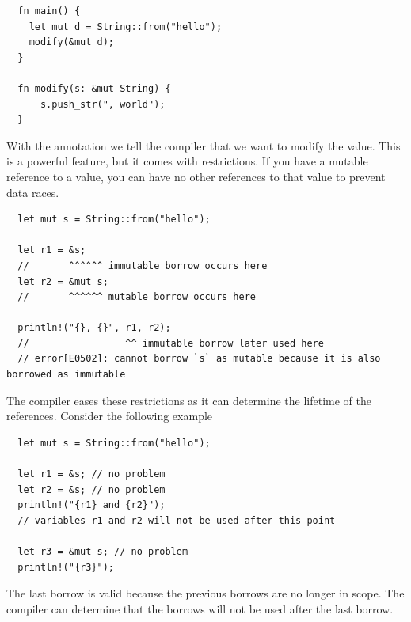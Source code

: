\documentclass[twoside,11pt]{report}
\theoremstyle{definition}
\theoremstyle{plain}
\begin{document}
\begin{verbatim}
  fn main() {
    let mut d = String::from("hello");
    modify(&mut d);
  }
  
  fn modify(s: &mut String) {
      s.push_str(", world");
  }
 \end{verbatim}

With the  annotation we tell the compiler that we want to modify the value. This is a powerful feature, but it comes with restrictions. If you have a mutable reference to a value, you can have no other references to that value to prevent data races.
\begin{verbatim}
  let mut s = String::from("hello");

  let r1 = &s;
  //       ^^^^^^ immutable borrow occurs here
  let r2 = &mut s;
  //       ^^^^^^ mutable borrow occurs here

  println!("{}, {}", r1, r2);
  //                 ^^ immutable borrow later used here
  // error[E0502]: cannot borrow `s` as mutable because it is also borrowed as immutable
\end{verbatim}
The compiler eases these restrictions as it can determine the lifetime of the references. Consider the following example
\begin{verbatim}
  let mut s = String::from("hello");

  let r1 = &s; // no problem
  let r2 = &s; // no problem
  println!("{r1} and {r2}");
  // variables r1 and r2 will not be used after this point

  let r3 = &mut s; // no problem
  println!("{r3}");
\end{verbatim}
The last borrow is valid because the previous borrows are no longer in scope. The compiler can determine that the borrows will not be used after the last borrow.
\end{document}
